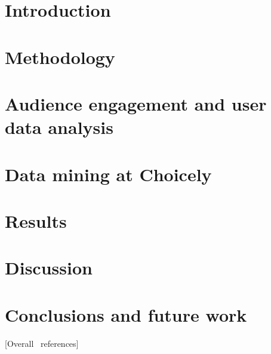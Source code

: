\documentclass[english]{tktltiki}
\begin{document}
\mytableofcontents

	\section{Introduction}
	\label{section::introduction}
	
	
	\section{Methodology}
	\label{section::methodology}
	
	
	\section{Audience engagement and user data analysis}
	\label{section::audience-engagement-and-user-data-analysis}
		
	
	\section{Data mining at Choicely}
	\label{section::data-mining-at-choicely}
	

	\section{Results}
	\label{section::results}
	

	\section{Discussion}
	\label{section::discussion}
	

	\section{Conclusions and future work}
	\label{section::conclusions}
	    

\pagebreak

[Overall \ references]

\nocite{*}



\lastpage
\appendices
\pagestyle{empty}

%
%
\end{document}
